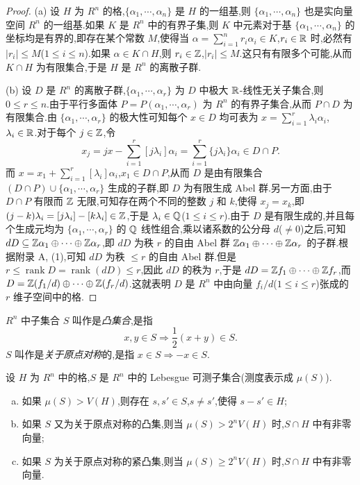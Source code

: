 \begin{proof}
(a) 设 $H$ 为 $R^n$ 的格,$\{\alpha_1,\cdots,\alpha_n\}$ 是 $H$ 的一组基,则 $\{\alpha_1,\cdots,\alpha_n\}$ 也是实向量空间 $R^n$ 的一组基.如果 $K$ 是 $R^n$ 中的有界子集,则 $K$ 中元素对于基 $\{\alpha_1,\cdots,\alpha_n\}$ 的坐标均是有界的,即存在某个常数 $M$,使得当 $\alpha=\sum_{i=1}^{n}r_i\alpha_i\in K$,$r_i\in\mathbb{R}$ 时,必然有 $|r_i|\leqslant M$($1\leqslant i\leqslant n$).如果 $\alpha\in K\cap H$,则 $r_i\in\mathbb{Z}$,$|r_i|\leqslant M$.这只有有限多个可能,从而 $K\cap H$ 为有限集合,于是 $H$ 是 $R^n$ 的离散子群.

(b) 设 $D$ 是 $R^n$ 的离散子群,$\{\alpha_1,\cdots,\alpha_r\}$ 为 $D$ 中极大 $\mathbb{R}$-线性无关子集合,则 $0\leqslant r\leqslant n$.由于平行多面体 $P=P(\alpha_1,\cdots,\alpha_r)$ 为 $R^n$ 的有界子集合,从而 $P\cap D$ 为有限集合.由 $\{\alpha_1,\cdots,\alpha_r\}$ 的极大性可知每个 $x\in D$ 均可表为 $x=\sum_{i=1}^{r}\lambda_i\alpha_i$,$\lambda_i\in\mathbb{R}$.对于每个 $j\in\mathbb{Z}$,令
\[
  x_j=jx-\sum_{i=1}^{r}[j\lambda_i]\alpha_i=\sum_{i=1}^{r}\{j\lambda_i\}\alpha_i\in D\cap P.
\]
而 $x=x_1+\sum_{i=1}^{r}[\lambda_i]\alpha_i$,$x_1\in D\cap P$,从而 $D$ 是由有限集合 $(D\cap P)\cup\{\alpha_1,\cdots,\alpha_r\}$ 生成的子群,即 $D$ 为有限生成 Abel 群.另一方面,由于 $D\cap P$ 有限而 $\mathbb{Z}$ 无限,可知存在两个不同的整数 $j$ 和 $k$,使得 $x_j=x_k$,即 $(j-k)\lambda_i=[j\lambda_i]-[k\lambda_i]\in\mathbb{Z}$,于是 $\lambda_i\in\mathbb{Q}$($1\leqslant i\leqslant r$).由于 $D$ 是有限生成的,并且每个生成元均为 $\{\alpha_1,\cdots,\alpha_r\}$ 的 $\mathbb{Q}$ 线性组合,乘以诸系数的公分母 $d$($\neq 0$)之后,可知 $dD\subseteq\mathbb{Z}\alpha_1\oplus\cdots\oplus\mathbb{Z}\alpha_r$,即 $dD$ 为秩 $r$ 的自由 Abel 群 $\mathbb{Z}\alpha_1\oplus\cdots\oplus\mathbb{Z}\alpha_r$ 的子群.根据附录 A, (1),可知 $dD$ 为秩 $\leqslant r$ 的自由 Abel 群.但是 $r\leqslant\operatorname{rank}D=\operatorname{rank}(dD)\leqslant r$,因此 $dD$ 的秩为 $r$,于是 $dD=\mathbb{Z} f_1\oplus\cdots\oplus\mathbb{Z} f_r$,而 $D=\mathbb{Z}(f_1/d)\oplus\cdots\oplus\mathbb{Z}(f_r/d)$.这就表明 $D$ 是 $R^n$ 中由向量 $f_i/d$($1\leqslant i\leqslant r$)张成的 $r$ 维子空间中的格.
\end{proof}

\begin{definition}\label{def:ch3-3}
$R^n$ 中子集合 $S$ 叫作是\emph{凸集合},是指
\[
  x,y\in S\Rightarrow\frac{1}{2}(x+y)\in S.
\]
$S$ 叫作是\emph{关于原点对称}的,是指 $x\in S\Rightarrow -x\in S$.
\end{definition}

\begin{theorem}\label{thm:3.1}
设 $H$ 为 $R^n$ 中的格,$S$ 是 $R^n$ 中的 Lebesgue 可测子集合(测度表示成 $\mu(S)$).
\begin{enumerate}[(a)]
  \item 如果 $\mu(S)>V(H)$,则存在 $s,s'\in S$,$s\neq s'$,使得 $s-s'\in H$;
  \item 如果 $S$ 又为关于原点对称的凸集,则当 $\mu(S)>2^nV(H)$ 时,$S\cap H$ 中有非零向量;
  \item 如果 $S$ 为关于原点对称的紧凸集,则当 $\mu(S)\geqslant 2^nV(H)$ 时,$S\cap H$ 中有非零向量.
\end{enumerate}
\end{theorem}

